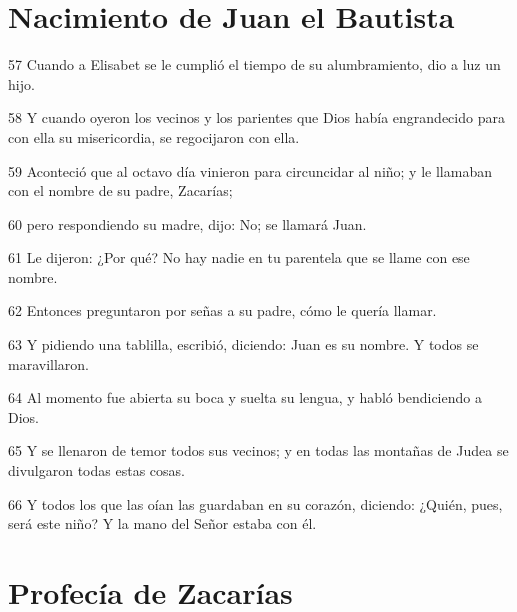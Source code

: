 \section*{Nacimiento de Juan el Bautista}

\par 57 Cuando a Elisabet se le cumplió el tiempo de su alumbramiento, dio a luz un hijo.
\par 58 Y cuando oyeron los vecinos y los parientes que Dios había engrandecido para con ella su misericordia, se regocijaron con ella.
\par 59 Aconteció que al octavo día vinieron para circuncidar al niño; y le llamaban con el nombre de su padre, Zacarías;
\par 60 pero respondiendo su madre, dijo: No; se llamará Juan.
\par 61 Le dijeron: ¿Por qué? No hay nadie en tu parentela que se llame con ese nombre.
\par 62 Entonces preguntaron por señas a su padre, cómo le quería llamar.
\par 63 Y pidiendo una tablilla, escribió, diciendo: Juan es su nombre. Y todos se maravillaron.
\par 64 Al momento fue abierta su boca y suelta su lengua, y habló bendiciendo a Dios.
\par 65 Y se llenaron de temor todos sus vecinos; y en todas las montañas de Judea se divulgaron todas estas cosas.
\par 66 Y todos los que las oían las guardaban en su corazón, diciendo: ¿Quién, pues, será este niño? Y la mano del Señor estaba con él.

\section*{Profecía de Zacarías}

